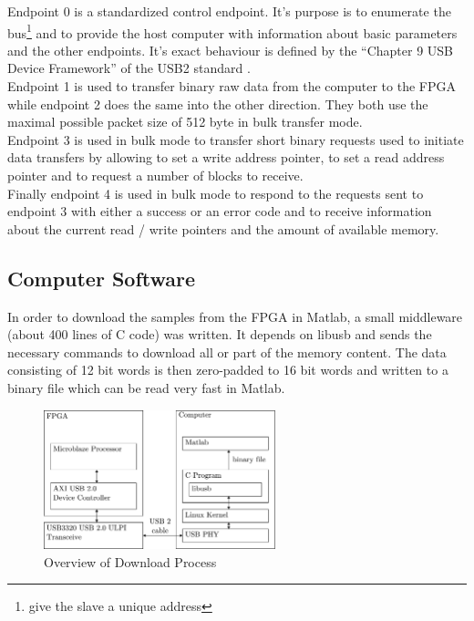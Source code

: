 Endpoint 0 is a standardized control endpoint. It's purpose is to
enumerate the bus\footnote{give the slave a unique address} and to provide the
host computer with information about basic parameters and the other endpoints.
It's exact behaviour is defined by the
``Chapter 9 USB Device Framework'' of the \gls{USB}2 standard . \\

Endpoint 1 is used to transfer binary raw data from the computer to the \gls{FPGA}
while endpoint 2 does the same into the other direction. They both use the maximal
possible packet size of 512 byte in bulk transfer mode. \\

Endpoint 3 is used in bulk mode to transfer short binary requests used to
initiate data transfers by allowing to set a write address pointer,
to set a read address pointer and to request a number of blocks to receive. \\

Finally endpoint 4 is used in bulk mode to respond to the requests sent
to endpoint 3 with either a success or an error code and to receive information
about the current read / write pointers and the amount of available memory. \\

\subsection{Computer Software}
In order to download the samples from the \gls{FPGA} in Matlab, a small
middleware (about 400 lines of C code) was written.
It depends on libusb  and sends the necessary commands
to download all or part of the memory content.
The data consisting of 12 bit words is then zero-padded to 16 bit words
and written to a binary file which can be read very fast in Matlab. \\

\begin{figure}[ht]
  \centering
  \includegraphics[width=0.6\textwidth]{figures/fpga_download}
  \caption{Overview of Download Process}
  \label{fig:fpga_download}
\end{figure}

